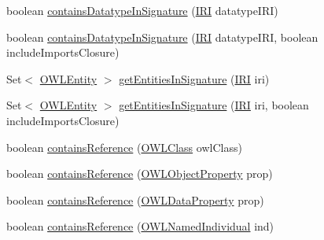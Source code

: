 \begin{DoxyCompactItemize}
\item 
boolean \hyperlink{classuk_1_1ac_1_1manchester_1_1cs_1_1owl_1_1owlapi_1_1_o_w_l_ontology_impl_ab1b23f08c1d76f401b217329405da2f7}{contains\-Datatype\-In\-Signature} (\hyperlink{classorg_1_1semanticweb_1_1owlapi_1_1model_1_1_i_r_i}{I\-R\-I} datatype\-I\-R\-I)
\item 
boolean \hyperlink{classuk_1_1ac_1_1manchester_1_1cs_1_1owl_1_1owlapi_1_1_o_w_l_ontology_impl_ae2e961c9cda7a4dad29ab7f77cecb88b}{contains\-Datatype\-In\-Signature} (\hyperlink{classorg_1_1semanticweb_1_1owlapi_1_1model_1_1_i_r_i}{I\-R\-I} datatype\-I\-R\-I, boolean include\-Imports\-Closure)
\item 
Set$<$ \hyperlink{interfaceorg_1_1semanticweb_1_1owlapi_1_1model_1_1_o_w_l_entity}{O\-W\-L\-Entity} $>$ \hyperlink{classuk_1_1ac_1_1manchester_1_1cs_1_1owl_1_1owlapi_1_1_o_w_l_ontology_impl_ab63a85ab870526ba8f880cd4f96f4344}{get\-Entities\-In\-Signature} (\hyperlink{classorg_1_1semanticweb_1_1owlapi_1_1model_1_1_i_r_i}{I\-R\-I} iri)
\item 
Set$<$ \hyperlink{interfaceorg_1_1semanticweb_1_1owlapi_1_1model_1_1_o_w_l_entity}{O\-W\-L\-Entity} $>$ \hyperlink{classuk_1_1ac_1_1manchester_1_1cs_1_1owl_1_1owlapi_1_1_o_w_l_ontology_impl_adadeeab85688b8889cee8b1f28836aa0}{get\-Entities\-In\-Signature} (\hyperlink{classorg_1_1semanticweb_1_1owlapi_1_1model_1_1_i_r_i}{I\-R\-I} iri, boolean include\-Imports\-Closure)
\item 
boolean \hyperlink{classuk_1_1ac_1_1manchester_1_1cs_1_1owl_1_1owlapi_1_1_o_w_l_ontology_impl_a11c85e76c9113e8417a966530312afde}{contains\-Reference} (\hyperlink{interfaceorg_1_1semanticweb_1_1owlapi_1_1model_1_1_o_w_l_class}{O\-W\-L\-Class} owl\-Class)
\item 
boolean \hyperlink{classuk_1_1ac_1_1manchester_1_1cs_1_1owl_1_1owlapi_1_1_o_w_l_ontology_impl_a1f78ae51480e0517c6d54c36bf93774f}{contains\-Reference} (\hyperlink{interfaceorg_1_1semanticweb_1_1owlapi_1_1model_1_1_o_w_l_object_property}{O\-W\-L\-Object\-Property} prop)
\item 
boolean \hyperlink{classuk_1_1ac_1_1manchester_1_1cs_1_1owl_1_1owlapi_1_1_o_w_l_ontology_impl_af83975be4ffd83020fbdd3fd7d34f615}{contains\-Reference} (\hyperlink{interfaceorg_1_1semanticweb_1_1owlapi_1_1model_1_1_o_w_l_data_property}{O\-W\-L\-Data\-Property} prop)
\item 
boolean \hyperlink{classuk_1_1ac_1_1manchester_1_1cs_1_1owl_1_1owlapi_1_1_o_w_l_ontology_impl_afd5fb10d8bc4b1fae43e3e22db89fec8}{contains\-Reference} (\hyperlink{interfaceorg_1_1semanticweb_1_1owlapi_1_1model_1_1_o_w_l_named_individual}{O\-W\-L\-Named\-Individual} ind)

\end{DoxyCompactItemize}
